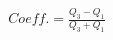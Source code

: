 \documentclass[preview]{standalone}
\begin{document}
\begin{align*}
Coeff.=\frac{Q_3-Q_1}{Q_3+Q_1}
\end{align*}
\end{document}
